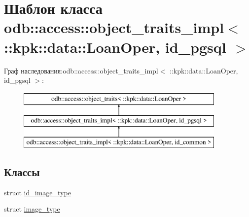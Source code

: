 \hypertarget{classodb_1_1access_1_1object__traits__impl_3_01_1_1kpk_1_1data_1_1_loan_oper_00_01id__pgsql_01_4}{}\section{Шаблон класса odb\+:\+:access\+:\+:object\+\_\+traits\+\_\+impl$<$ \+:\+:kpk\+:\+:data\+:\+:Loan\+Oper, id\+\_\+pgsql $>$}
\label{classodb_1_1access_1_1object__traits__impl_3_01_1_1kpk_1_1data_1_1_loan_oper_00_01id__pgsql_01_4}
Граф наследования\+:odb\+:\+:access\+:\+:object\+\_\+traits\+\_\+impl$<$ \+:\+:kpk\+:\+:data\+:\+:Loan\+Oper, id\+\_\+pgsql $>$\+:\begin{figure}[H]
\begin{center}
\leavevmode
\includegraphics[height=3.000000cm]{classodb_1_1access_1_1object__traits__impl_3_01_1_1kpk_1_1data_1_1_loan_oper_00_01id__pgsql_01_4}
\end{center}
\end{figure}
\subsection*{Классы}
\begin{DoxyCompactItemize}
\item 
struct \hyperlink{structodb_1_1access_1_1object__traits__impl_3_01_1_1kpk_1_1data_1_1_loan_oper_00_01id__pgsql_01_4_1_1id__image__type}{id\+\_\+image\+\_\+type}
\item 
struct \hyperlink{structodb_1_1access_1_1object__traits__impl_3_01_1_1kpk_1_1data_1_1_loan_oper_00_01id__pgsql_01_4_1_1image__type}{image\+\_\+type}
\end{DoxyCompactItemize}
